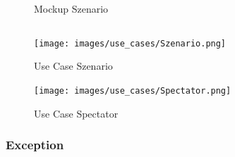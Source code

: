\begin{figure}[h]
	\centering
	\qquad
	\caption{Mockup Szenario}
\end{figure}
\newpage
\begin{verbatim}
\end{verbatim}
\begin{figure}[h]
	\begin{center}
		\texttt{[image: images/use\_cases/Szenario.png]}
	\end{center}
	\caption{Use Case Szenario}
	\label{fig:UC_Szenario_1}
\end{figure}
\begin{figure}[h]
	\begin{center}
		\texttt{[image: images/use\_cases/Spectator.png]}
	\end{center}
	\caption{Use Case Spectator}
	\label{fig:UC_Szenario_2}
\end{figure}

\newpage

\subsubsection{Exception}

